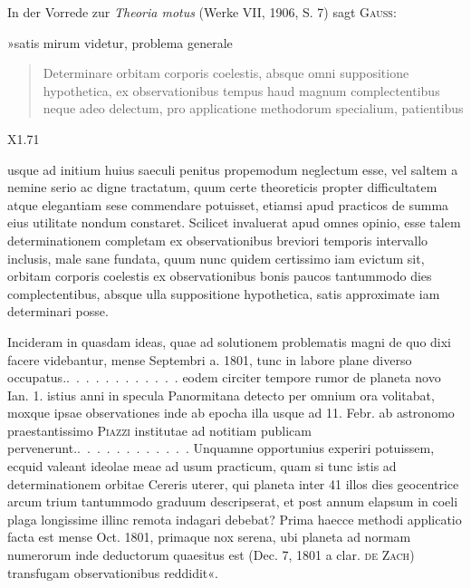 \par\noindent\hspace*{\parindent}In der Vorrede zur \textit{Theoria motus} (Werke VII, 1906, S. 7) sagt \textsc{Gauss}:
\par\noindent\hspace*{\parindent}»satis mirum videtur, problema generale
\begin{quote}
Determinare orbitam corporis coelestis, absque omni suppositione hypothetica, ex observationibus tempus haud magnum complectentibus neque adeo delectum, pro applicatione methodorum specialium, patientibus
\end{quote}
\par\endgroup
\par\medskip\noindent\small X1.\hfill 71\normalsize

\clearpage{}
\par\begingroup\small
\noindent usque ad initium huius saeculi penitus propemodum neglectum esse, vel saltem a nemine serio ac digne tractatum, quum certe theoreticis propter difficultatem atque elegantiam sese commendare potuisset, etiamsi apud practicos de summa eius utilitate nondum constaret. Scilicet invaluerat apud omnes opinio,  esse talem determinationem completam ex observationibus breviori temporis intervallo inclusis, male sane fundata, quum nunc quidem certissimo iam evictum sit, orbitam corporis coelestis ex observationibus bonis paucos tantummodo dies complectentibus, absque ulla suppositione hypothetica, satis approximate iam determinari posse.
\renewcommand{\thefootnote}{[*)]}
\par\noindent\hspace*{\parindent}Incideram in quasdam ideas, quae ad solutionem problematis magni de quo dixi facere videbantur, mense Septembri a. 1801, tunc in labore plane diverso occupatus\footnotemark.\quad .\ .\ .\ .\ .\ .\ .\ .\ .\ .\ .\ . eodem circiter tempore rumor de planeta novo Ian. 1. istius anni in specula Panormitana detecto per omnium ora volitabat, moxque ipsae observationes inde ab epocha illa usque ad 11. Febr. ab astronomo praestantissimo \textsc{Piazzi} institutae ad notitiam publicam pervenerunt.\quad .\ .\ .\ .\ .\ .\ .\ .\ .\ .\ .\ . Unquamne opportunius experiri potuissem, ecquid valeant ideolae meae ad usum practicum, quam si tunc istis ad determinationem orbitae Cereris uterer, qui planeta inter 41 illos dies geocentrice arcum trium tantummodo graduum descripserat, et post annum elapsum in coeli plaga longissime illinc remota indagari debebat? Prima haecce methodi applicatio facta est mense Oct. 1801, primaque nox serena, ubi planeta ad normam numerorum inde deductorum quaesitus est (Dec. 7, 1801 a clar. \textsc{de Zach}) transfugam observationibus reddidit«.
